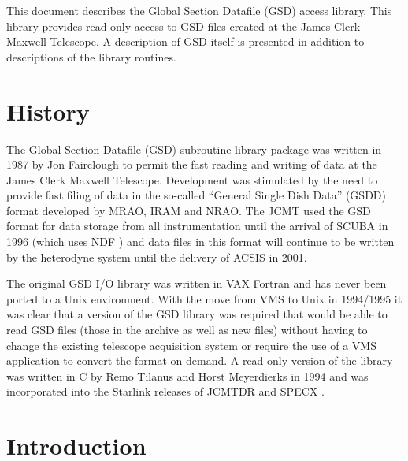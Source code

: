 \documentclass[twoside,11pt]{article}
\newcommand{\stardocinitials}  {SUN}
\newcommand{\stardocnumber}    {229.1}
\newcommand{\stardocabstract}  {%
This document describes the Global Section Datafile (GSD) access library.
This library provides read-only access to GSD files created at the
James Clerk Maxwell Telescope. A description of GSD itself is presented
in addition to descriptions of the library routines.
}
\newcommand{\stardocname}{\stardocinitials /\stardocnumber}
\newenvironment{latexonly}{}{}
\renewcommand{\_}{\texttt{\symbol{95}}}
\renewcommand{\thepage}{\roman{page}}
\begin{document}
\stardocabstract
  \newpage
  \begin{latexonly}
    \setlength{\parskip}{0mm}
    \tableofcontents
    \setlength{\parskip}{\medskipamount}
    \markboth{\stardocname}{\stardocname}
  \end{latexonly}
\cleardoublepage
\renewcommand{\thepage}{\arabic{page}}
\setcounter{page}{1}


\section{History}

The Global Section Datafile (GSD) subroutine library package was written in
1987 by Jon Fairclough \cite{F89} to permit the fast reading and writing of
data at the James Clerk Maxwell Telescope. Development was stimulated by the
need to provide fast filing of data in the so-called ``General Single Dish
Data'' (GSDD) format developed by MRAO, IRAM and NRAO. The JCMT used the GSD
format for data storage from all instrumentation until the arrival of SCUBA
\cite{scuba} in 1996 (which uses NDF \cite{ndf}) and data files in this format
will continue to be written by the heterodyne system until the delivery of
ACSIS in 2001.

The original GSD I/O library was written in VAX Fortran and has never been
ported to a Unix environment. With the move from VMS to Unix in 1994/1995 it
was clear that a version of the GSD library was required that would be able to
read GSD files (those in the archive as well as new files) without having to
change the existing telescope acquisition system or require the use of a VMS
application to convert the format on demand. A read-only version of the
library was written in C by Remo Tilanus and Horst Meyerdierks in 1994 and was
incorporated into the Starlink releases of JCMTDR \cite{jcmtdr} and SPECX
\cite{specx}.

\section{Introduction}
\end{document}
